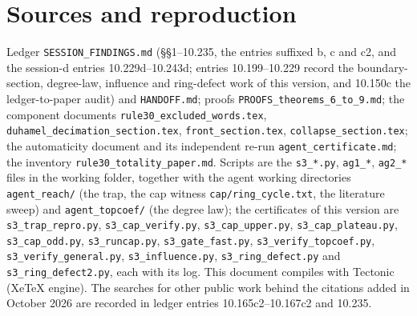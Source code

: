 \documentclass[11pt]{article}
\theoremstyle{definition}
\theoremstyle{remark}
\begin{document}
\section{Sources and reproduction}\label{sec:sources}
Ledger \texttt{SESSION\_FINDINGS.md} (\S\S1--10.235, the entries suffixed b, c and c2, and the session-d entries 10.229d--10.243d; entries 10.199--10.229 record the boundary-section, degree-law, influence and ring-defect work of this version, and 10.150c the ledger-to-paper audit) and \texttt{HANDOFF.md}; proofs \texttt{PROOFS\_theorems\_6\_to\_9.md}; the component documents \texttt{rule30\_excluded\_words.tex}, \texttt{duhamel\_decimation\_section.tex}, \texttt{front\_section.tex}, \texttt{collapse\_section.tex}; the automaticity document \cite{Auto} and its independent re-run \texttt{agent\_certificate.md}; the inventory \texttt{rule30\_totality\_paper.md}. Scripts are the \texttt{s3\_*.py}, \texttt{ag1\_*}, \texttt{ag2\_*} files in the working folder, together with the agent working directories \texttt{agent\_reach/} (the trap, the cap witness \texttt{cap/ring\_cycle.txt}, the literature sweep) and \texttt{agent\_topcoef/} (the degree law); the certificates of this version are \texttt{s3\_trap\_repro.py}, \texttt{s3\_cap\_verify.py}, \texttt{s3\_cap\_upper.py}, \texttt{s3\_cap\_plateau.py}, \texttt{s3\_cap\_odd.py}, \texttt{s3\_runcap.py}, \texttt{s3\_gate\_fast.py}, \texttt{s3\_verify\_topcoef.py}, \texttt{s3\_verify\_general.py}, \texttt{s3\_influence.py}, \texttt{s3\_ring\_defect.py} and \texttt{s3\_ring\_defect2.py}, each with its log. This document compiles with Tectonic (XeTeX engine). The searches for other public work behind the citations added in October 2026 are recorded in ledger entries 10.165c2--10.167c2 and 10.235.
\end{document}
